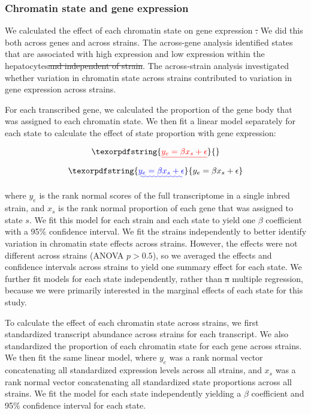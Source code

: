 \documentclass[
  11pt,
]{article}
\providecommand{\DIFaddtex}[1]{{\protect\color{blue}\uwave{#1}}} %
\providecommand{\DIFdeltex}[1]{{\protect\color{red}\sout{#1}}}                      %
\providecommand{\DIFaddbegin}{} %
\providecommand{\DIFaddend}{} %
\providecommand{\DIFdelbegin}{} %
\providecommand{\DIFdelend}{} %
\providecommand{\DIFadd}[1]{\texorpdfstring{\DIFaddtex{#1}}{#1}} %
\providecommand{\DIFdel}[1]{\texorpdfstring{\DIFdeltex{#1}}{}} %
\newcommand{\DIFscaledelfig}{0.5}
\newlength{\DIFdelgraphicswidth} %
\newlength{\DIFdelgraphicsheight} %
\newcommand{\DIFaddincludegraphics}[2][]{{\color{blue}\fbox{\DIFOincludegraphics[#1]{#2}}}} %
\newcommand{\DIFdelincludegraphics}[2][]{%
\sbox{\DIFdelgraphicsbox}{\DIFOincludegraphics[#1]{#2}}%
\settoboxwidth{\DIFdelgraphicswidth}{\DIFdelgraphicsbox} %
\settoboxtotalheight{\DIFdelgraphicsheight}{\DIFdelgraphicsbox} %
\scalebox{\DIFscaledelfig}{%
\parbox[b]{\DIFdelgraphicswidth}{\usebox{\DIFdelgraphicsbox}\\[-\baselineskip] \rule{\DIFdelgraphicswidth}{0em}}\llap{\resizebox{\DIFdelgraphicswidth}{\DIFdelgraphicsheight}{%
\setlength{\unitlength}{\DIFdelgraphicswidth}%
\begin{picture}(1,1)%
\thicklines\linethickness{2pt} %
{\color[rgb]{1,0,0}\put(0,0){\framebox(1,1){}}}%
{\color[rgb]{1,0,0}\put(0,0){\line( 1,1){1}}}%
{\color[rgb]{1,0,0}\put(0,1){\line(1,-1){1}}}%
\end{picture}%
}\hspace*{3pt}}} %
} %
\DeclareRobustCommand{\DIFaddbegin}{\DIFOaddbegin \let\includegraphics\DIFaddincludegraphics} %
\DeclareRobustCommand{\DIFaddend}{\DIFOaddend \let\includegraphics\DIFOincludegraphics} %
\DeclareRobustCommand{\DIFdelbegin}{\DIFOdelbegin \let\includegraphics\DIFdelincludegraphics} %
\DeclareRobustCommand{\DIFdelend}{\DIFOaddend \let\includegraphics\DIFOincludegraphics} %
\begin{document}
\hypertarget{chromatin-state-and-gene-expression}{%
\subsubsection{Chromatin state and gene
expression}\label{chromatin-state-and-gene-expression}}

We calculated the effect of each chromatin state on gene expression
\DIFdelbegin \DIFdel{. }\DIFdelend \DIFaddbegin \DIFadd{(Fig. \ref{fig:state_overview}C). }\DIFaddend We did this both across genes and
across strains. The across-gene analysis identified states that are
associated with high expression and low expression within the
hepatocytes\DIFdelbegin \DIFdel{and independent of strain}\DIFdelend . The across-strain analysis investigated whether variation
in chromatin state across strains contributed to variation in gene
expression across strains.

For each transcribed gene, we calculated the proportion of the gene body
that was assigned to each chromatin state. We then fit a linear model
separately for each state to calculate the effect of state proportion
with gene expression:

\DIFdelbegin \[\DIFdel{y_{e} = \beta x_{s} + \epsilon}\]%
\DIFdelend \DIFaddbegin \begin{equation}\DIFadd{\label{eqn:model}
y_{e} = \beta x_{s} + \epsilon
}\end{equation}\DIFaddend 

where \(y_{e}\) is the rank normal scores \citep{conover1999practical}
of the full transcriptome in a single inbred strain, and \(x_{s}\) is
the rank normal proportion of each gene that was assigned to state
\(s\). We fit this model for each strain and each state to yield one
\(\beta\) coefficient with a 95\% confidence interval. We fit the
strains independently to better identify variation in chromatin state
effects across strains. However, the effects were not different across
strains (ANOVA \(p > 0.5\)), so we averaged the effects and confidence
intervals across strains to yield one summary effect for each state. We
further fit models for each state independently, rather than \DIFdelbegin \DIFdel{a }\DIFdelend \DIFaddbegin \DIFadd{using
}\DIFaddend multiple regression, because we were primarily interested in the
marginal effects of each state for this study.

To calculate the effect of each chromatin state across strains, we first
standardized transcript abundance across strains for each transcript. We
also standardized the proportion of each chromatin state for each gene
across strains. We then fit the same linear model, where \(y_{e}\) was a
rank normal vector concatenating all standardized expression levels
across all strains, and \(x_{s}\) was a rank normal vector concatenating
all standardized state proportions across all strains. We fit the model
for each state independently yielding a \(\beta\) coefficient and 95\%
confidence interval for each state.
\end{document}
